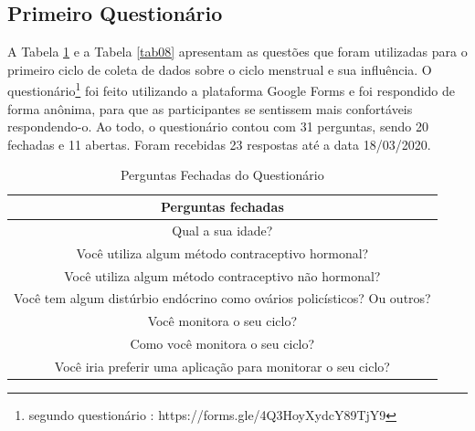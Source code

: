 \subsection{Primeiro Questionário}

A Tabela \ref{tab07} e a Tabela \ref{tab08} apresentam as questões que foram utilizadas para o primeiro ciclo de coleta de dados sobre o ciclo menstrual e 
sua influência. O questionário\footnote{segundo questionário : https://forms.gle/4Q3HoyXydcY89TjY9} foi feito utilizando a plataforma Google Forms e foi respondido de forma anônima, para que as
participantes se sentissem mais confortáveis respondendo-o. Ao todo, o questionário contou com 31 perguntas, sendo 20 fechadas e 
11 abertas. Foram recebidas 23 respostas até a data 18/03/2020.

\begin{table}[ht]
    \centering
    \caption{Perguntas Fechadas do Questionário}
    \label{tab07}
    \begin{tabular}{c}
        \toprule
        \textbf{Perguntas fechadas} \\
        \midrule
        \begin{minipage} [t] {1\textwidth} Qual a sua idade?  \end{minipage} \\
        \midrule
        \begin{minipage} [t] {1\textwidth} Você utiliza algum método contraceptivo hormonal?   \end{minipage}\\
        \midrule
        \begin{minipage} [t] {1\textwidth} Você utiliza algum método contraceptivo não hormonal?  \end{minipage} \\
        \midrule
        \begin{minipage} [t] {1\textwidth}  Você tem algum distúrbio endócrino como ovários policísticos? Ou outros? \end{minipage}  \\
        \midrule
        \begin{minipage} [t] {1\textwidth}  Você monitora o seu ciclo? \end{minipage}\\
        \midrule
        \begin{minipage} [t] {1\textwidth}  Como você monitora o seu ciclo? \end{minipage} \\
        \midrule
        \begin{minipage} [t] {1\textwidth}  Você iria preferir uma aplicação para monitorar o seu ciclo?\end{minipage}\\

\end{tabular}
\end{table}
